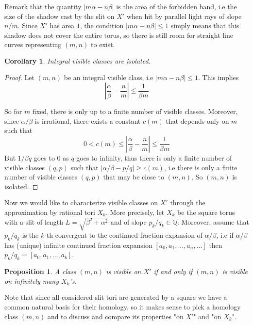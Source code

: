 \documentclass{article}
\newcommand{\QQ}{\mathbb{Q}}
\newtheorem{cor}{Corollary}[thm]
\newtheorem{prop}[thm]{Proposition}
\theoremstyle{definition}
\begin{document}
Remark that the quantity $|m\alpha -n\beta|$ is the area of the forbidden band, i.e the size of the shadow cast by the slit on $X'$ when hit by parallel light rays of slope $n/m$. Since $X'$ has area $1$, the condition $|m\alpha -n\beta|\le 1$ simply means that this shadow does not cover the entire torus, so there is still room for straight line curves representing $(m,n)$ to exist.

\begin{cor}
    Integral visible classes are isolated.
\end{cor}

\begin{proof}
    Let $(m,n)$ be an integral visible class, i.e $|m\alpha -n\beta| \le 1$. This implies $$\left |\frac{\alpha}{\beta} - \frac{n}{m} \right | \le \frac{1}{\beta m} $$

    So for $m$ fixed, there is only up to a finite number of visible classes. Moreover, since $\alpha/\beta$ is irrational, there exists a constant $c(m)$ that depends only on $m$ such that
    $$0 < c(m) \le \left |\frac{\alpha}{\beta} - \frac{n}{m} \right | \le \frac{1}{\beta m} $$
    But $1/\beta q$ goes to $0$ as $q$ goes to infinity, thus there is only a finite number of visible classes $(q,p)$ such that $| \alpha/\beta - p/q| \ge c(m)$, i.e there is only a finite number of visible classes $(q,p)$ that may be close to $(m,n)$. So $(m,n)$ is isolated.
    
\end{proof}

Now we would like to characterize visible classes on $X'$ through the approximation by rational tori $X_k$. More precisely, let $X_k$ be the square torus with a slit of length $L=\sqrt{\beta^2+\alpha^2}$ and of slope $p_k/q_k\in \QQ$.  Moreover, assume that $p_k/q_k$ is the $k$-th convergent to the continued fraction expansion of $\alpha/\beta$, i.e if $\alpha / \beta$ has (unique) infinite continued fraction expansion $[a_0,a_1,...,a_n,...]$ then $p_k/q_k= [a_0,a_1,...,a_k]$. 


\begin{prop}\label{limit}
    A class $(m,n)$ is visible on $X'$ if and only if $(m,n)$ is visible on infinitely many $X_k$'s.
\end{prop}

Note that since all considered slit tori are generated by a square we have a common natural basis for their homology, so it makes sense to pick a homology class $(m,n)$ and to discuss and compare its properties "on $X'$" and "on $X_k$".
\end{document}
